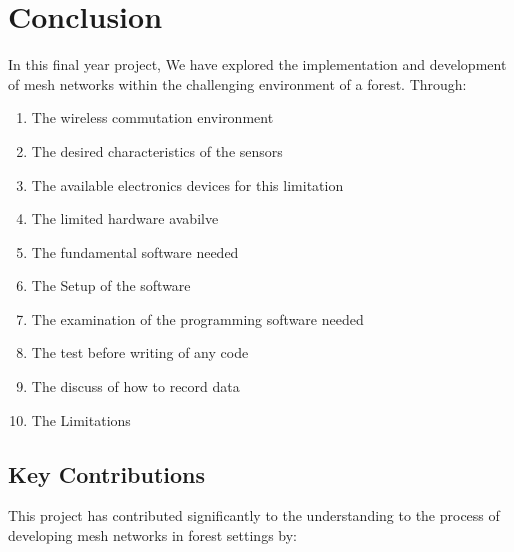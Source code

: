 \section{Conclusion}
\label{ch:conclusion} %

In this final year project, We have explored the implementation and development of mesh networks within the challenging environment of a forest. Through:
\begin{enumerate}
    \item The wireless commutation environment 
    \item The desired characteristics of the sensors
    \item The available electronics devices for this limitation
    \item The limited hardware avabilve
    \item The  fundamental software needed
    \item The Setup of the software
    \item The examination of the programming software needed
    \item The test before writing of any code 
    \item The discuss of how to record data
    \item The Limitations
\end{enumerate}
\subsection{Key Contributions}

This project has contributed significantly to the understanding to the process of developing mesh networks in forest settings by:

